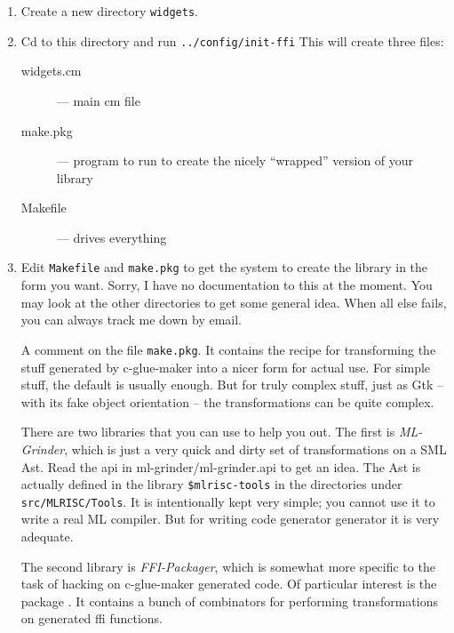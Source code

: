\documentclass{article}
\begin{document}
\begin{enumerate}
   \item Create a new directory {\tt widgets}.

   \item  Cd to this directory and run {\tt ../config/init-ffi}
        This will create three files:

     \begin{description}
      \item[widgets.cm] --- main cm file
      \item[make.pkg]   --- program to run to create the nicely ``wrapped''
                            version of your library 
      \item[Makefile]   --- drives everything
     \end{description}

   \item Edit {\tt Makefile} and 
        {\tt make.pkg} to get the system to create the library
        in the form you want.  Sorry, I have no documentation to this at the
        moment.
        You may look at the other directories to get some general idea.
        When all else fails, you can always track me down by email.
    
        A comment on the file {\tt make.pkg}.  It contains the recipe for 
        transforming the stuff generated by c-glue-maker into a nicer 
        form for actual use.  For simple stuff, the default is usually enough.  
        But for truly complex stuff, just as Gtk -- with its fake object 
        orientation -- the transformations can be quite complex.   
    
        There are two libraries that you can use to help you out.  
        The first is {\em ML-Grinder}, 
       which is just a very quick and dirty set  
        of transformations on a SML Ast.  Read the api in 
        ml-grinder/ml-grinder.api to get an idea.  The Ast is actually defined
        in the library {\tt \$mlrisc-tools} in the directories under 
         {\tt src/MLRISC/Tools}.
        It is intentionally kept very simple; you cannot use it to write
        a real ML compiler.  But for writing code generator generator it
        is very adequate.
    
        The second library is {\em FFI-Packager}, which is somewhat more
        specific to the task of hacking on c-glue-maker generated code.
        Of particular interest is the package .
        It contains a bunch of combinators for performing transformations
        on generated ffi functions. 


\end{enumerate}
\end{document}
